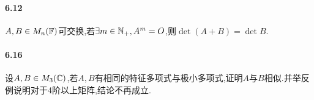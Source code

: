\documentclass[11pt]{article}
\begin{document}
\paragraph{6.12}$A,B\in M_n(\mathbb{F})$可交换,若$\exists m\in \mathbb{N}_+, A^m=O$,则$\det(A+B)=\det B$.
\paragraph{6.16}设$A,B\in M_3(\mathbb{C})$,若$A,B$有相同的特征多项式与极小多项式,证明$A$与$B$相似.并举反例说明对于4阶以上矩阵,结论不再成立.

\end{document}
